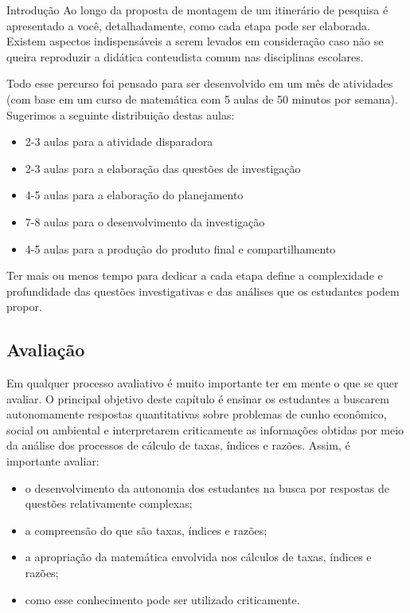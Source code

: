 \begin{apresentacao}{Introdução}
Ao longo da proposta de montagem de um itinerário de pesquisa é apresentado a você, detalhadamente, como cada etapa pode ser elaborada. Existem aspectos indispensáveis a serem levados em consideração caso não se queira reproduzir a didática  conteudista comum nas disciplinas escolares.

Todo esse percurso foi pensado para ser desenvolvido em um mês de atividades (com base em um curso de matemática com 5 aulas de 50 minutos por semana). Sugerimos a seguinte distribuição destas aulas: 

\begin{itemize}
\item 2-3 aulas para a atividade disparadora
\item 2-3 aulas para a elaboração das questões de investigação
\item 4-5 aulas para a elaboração do planejamento 
\item 7-8 aulas para o desenvolvimento da investigação
\item 4-5 aulas para a produção do produto final e compartilhamento
\end{itemize}

Ter mais ou menos tempo para dedicar a cada etapa define a complexidade e profundidade das questões investigativas e das análises que os estudantes podem propor.

\subsection{Avaliação}

Em qualquer processo avaliativo é muito importante ter em mente o que se quer avaliar. O principal objetivo deste capítulo é ensinar os estudantes a buscarem autonomamente respostas quantitativas sobre problemas de cunho econômico, social ou ambiental e interpretarem criticamente as informações obtidas por meio da análise dos processos de cálculo de taxas, índices e razões. Assim, é importante avaliar:

\begin{itemize}
\item o desenvolvimento da autonomia dos estudantes na busca por respostas de questões relativamente complexas;
\item a compreensão do que são taxas, índices e razões;
\item a apropriação da matemática envolvida nos cálculos de taxas, índices e razões;
\item como esse conhecimento pode ser utilizado criticamente.
\end{itemize}


\end{apresentacao}
